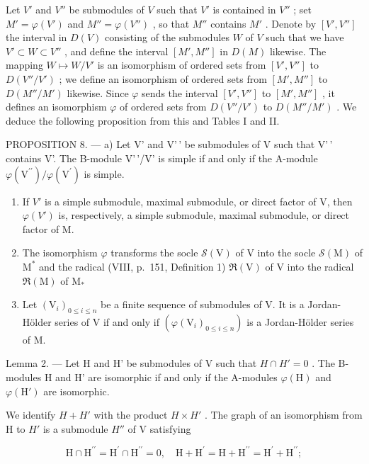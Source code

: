 Let \(V'\) and \(V''\) be submodules of \(V\) such that \(V'\) is contained in \(V''\) ; set \(M' = \varphi(V')\) and \(M'' = \varphi(V'')\) , so that \(M''\) contains \(M'\) . Denote by \([V', V'']\) the interval in \(D(V)\) consisting of the submodules \(W\) of \(V\) such that we have \(V' \subset W \subset V''\) , and define the interval \([M', M'']\) in \(D(M)\) likewise. The mapping \(W \mapsto W/V'\) is an isomorphism of ordered sets from \([V', V'']\) to \(D(V''/V')\) ; we define an isomorphism of ordered sets from \([M', M'']\) to \(D(M''/M')\) likewise. Since \(\varphi\) sends the interval \([V', V'']\) to \([M', M'']\) , it defines an isomorphism \(\varphi\) of ordered sets from \(D(V''/V')\) to \(D(M''/M')\) . We deduce the following proposition from this and Tables I and II.

PROPOSITION 8. --- a) Let V' and V'\,' be submodules of V such that V'\,' contains V'. The B-module V'\,'/V' is simple if and only if the A-module \(\varphi(\mathrm{V}^{\prime\prime})/\varphi(\mathrm{V}^{\prime})\) is simple.

\begin{enumerate}
\def\labelenumi{\alph{enumi})}
\setcounter{enumi}{1}
\item
  If \(V'\) is a simple submodule, maximal submodule, or direct factor of V, then \(\varphi(V')\) is, respectively, a simple submodule, maximal submodule, or direct factor of M.
\item
  The isomorphism \(\varphi\) transforms the socle \(\mathcal{S}(\mathrm{V})\) of \(\mathrm{V}\) into the socle \(\mathcal{S}(\mathrm{M})\) of \(\mathrm{M}^*\) and the radical (VIII, p.~151, Definition 1) \(\Re (\mathrm{V})\) of \(\mathrm{V}\) into the radical \(\Re (\mathrm{M})\) of \(\mathrm{M}_{*}\)
\item
  Let \((\mathrm{V}_{i})_{0\leqslant i\leqslant n}\) be a finite sequence of submodules of V. It is a Jordan-Hölder series of V if and only if \((\varphi(\mathrm{V}_{i})_{0\leqslant i\leqslant n})\) is a Jordan-Hölder series of M.
\end{enumerate}

Lemma 2. --- Let H and H' be submodules of V such that \(H \cap H' = 0\) . The B-modules H and H' are isomorphic if and only if the A-modules \(\varphi(\mathrm{H})\) and \(\varphi(\mathrm{H}')\) are isomorphic.

We identify \(H+H'\) with the product \(H \times H'\) . The graph of an isomorphism from H to \(H'\) is a submodule \(H''\) of V satisfying

\[
\mathrm{H} \cap \mathrm{H} ^ {\prime \prime} = \mathrm{H} ^ {\prime} \cap \mathrm{H} ^ {\prime \prime} = 0, \quad \mathrm{H} + \mathrm{H} ^ {\prime} = \mathrm{H} + \mathrm{H} ^ {\prime \prime} = \mathrm{H} ^ {\prime} + \mathrm{H} ^ {\prime \prime};\tag{17}
\]

